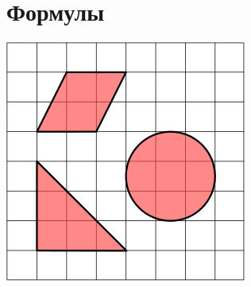 \documentclass[a4paper,8pt,leqno]{article}
\theoremstyle{plain}
\theoremstyle{definition} %
\theoremstyle{remark} %
\begin{document}
\section{Формулы}
\includegraphics [scale=1] {300px-Area.png}
\end{document}
